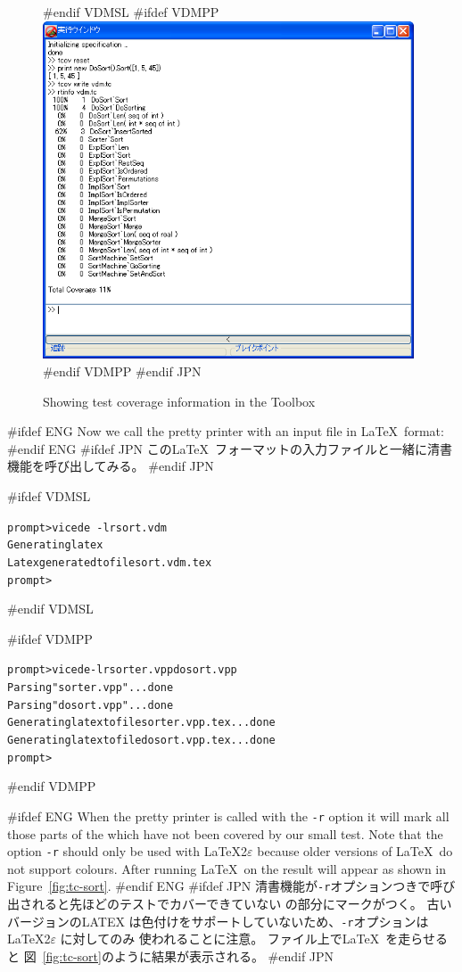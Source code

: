 \documentclass[\pformat,12pt]{article}
\newcommand{\Toolbox}{Toolbox}
\newcommand{\vdmde}{vdmde}
\newcommand{\Toolbox}{Toolbox}
\newcommand{\vdmde}{vppde}
\renewcommand{\vdmde}{vicede}
\begin{document}
\begin{figure}[tbh]
\begin{center}
#endif VDMSL
#ifdef VDMPP
\includegraphics[width=11cm]{guitcov-pp.png}
#endif VDMPP
#endif JPN
\caption{Showing test coverage information in the \protect\Toolbox}
\label{fig:rtinfo}
\end{center}
\end{figure}

#ifdef ENG
Now we call the pretty printer with an input file in \LaTeX\ format:
#endif ENG
#ifdef JPN
この\LaTeX\ フォーマットの入力ファイルと一緒に清書機能を呼び出してみる。
#endif JPN

#ifdef VDMSL
\begin{alltt}
prompt> \vdmde\ -lr sort.vdm 
Generating latex
Latex generated to file sort.vdm.tex
prompt>
\end{alltt}
#endif VDMSL

#ifdef VDMPP
\begin{alltt}
prompt> \vdmde -lr sorter.vpp dosort.vpp 
Parsing "sorter.vpp" ... done
Parsing "dosort.vpp" ... done
Generating latex to file sorter.vpp.tex ... done
Generating latex to file dosort.vpp.tex ... done
prompt>
\end{alltt}
#endif VDMPP

#ifdef ENG
When the pretty printer is called with the {\tt -r} option it will
mark all those parts of the  which have not been covered by our small
test. Note that the option {\tt -r} should only be used with
\LaTeX2$\varepsilon$ because older versions of \LaTeX\ do not
support colours. After running \LaTeX\ on
the result will appear as shown in Figure~\ref{fig:tc-sort}.
#endif ENG
#ifdef JPN
清書機能が{\tt -r}オプションつきで呼び出されると先ほどのテストでカバーできていない
 の部分にマークがつく。
古いバージョンのLATEX は色付けをサポートしていないため、{\tt -r}オプションは\LaTeX2$\varepsilon$ に対してのみ
使われることに注意。
ファイル上で\LaTeX\ を走らせると
図~\ref{fig:tc-sort}のように結果が表示される。
#endif JPN
\end{document}
